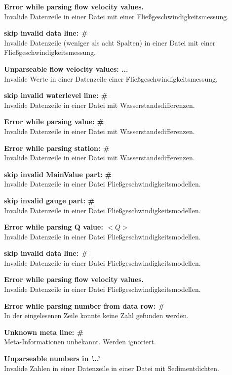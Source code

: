 \textbf{Error while parsing flow velocity values.}
\\Invalide Datenzeile in einer Datei mit einer Fließgeschwindigkeitsmessung.

\textbf{skip invalid data line: \#}
\\Invalide Datenzeile (weniger als acht Spalten)
in einer Datei mit einer Fließgeschwindigkeitsmessung.

\textbf{Unparseable flow velocity values: ...}
\\Invalide Werte in einer Datenzeile einer Fließgeschwindigkeitsmessung.

\textbf{skip invalid waterlevel line: \#}
\\Invalide Datenzeile in einer Datei mit Wasserstandsdifferenzen.

\textbf{Error while parsing value: \#}
\\Invalide Datenzeile in einer Datei mit Wasserstandsdifferenzen.

\textbf{Error while parsing station: \#}
\\Invalide Datenzeile in einer Datei mit Wasserstandsdifferenzen.

\textbf{skip invalid MainValue part: \#}
\\Invalide Datenzeile in einer Datei Fließgeschwindigkeitsmodellen.

\textbf{skip invalid gauge part: \#}
\\Invalide Datenzeile in einer Datei Fließgeschwindigkeitsmodellen.

\textbf{Error while parsing Q value: $<Q>$}
\\Invalide Datenzeile in einer Datei Fließgeschwindigkeitsmodellen.

\textbf{skip invalid data line: \#}
\\Invalide Datenzeile in einer Datei Fließgeschwindigkeitsmodellen.

\textbf{Error while parsing flow velocity values.}
\\Invalide Datenzeile in einer Datei Fließgeschwindigkeitsmodellen.

\textbf{Error while parsing number from data row: \#}
\\In der eingelesenen Zeile konnte keine Zahl gefunden werden.

\textbf{Unknown meta line: \#}
\\Meta-Informationen unbekannt. Werden ignoriert.

\textbf{Unparseable numbers in '...'}
\\Invalide Zahlen in einer Datenzeile in einer Datei mit Sedimentdichten.

